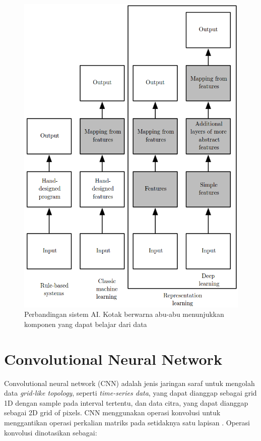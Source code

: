 \begin{figure}
    \centering
    \includegraphics[width=12cm]{gambar/landasan-teori/perbandingan-ai.png}
    \caption{Perbandingan sistem AI. Kotak berwarna abu-abu menunjukkan komponen yang dapat belajar dari data \citep{goodfellow-2016}}
    \label{gambar:perbandingan-ai}
\end{figure}


%
%
\section{Convolutional Neural Network}
Convolutional neural network (CNN) adalah jenis jaringan saraf untuk mengolah data \textit{grid-like topology}, seperti \textit{time-series data}, yang dapat dianggap sebagai grid 1D dengan sample pada interval tertentu, dan data citra, yang dapat dianggap sebagai 2D grid of pixels. CNN menggunakan operasi konvolusi untuk menggantikan operasi perkalian matriks pada setidaknya satu lapisan \citep{goodfellow-2016}. Operasi konvolusi dinotasikan sebagai:

